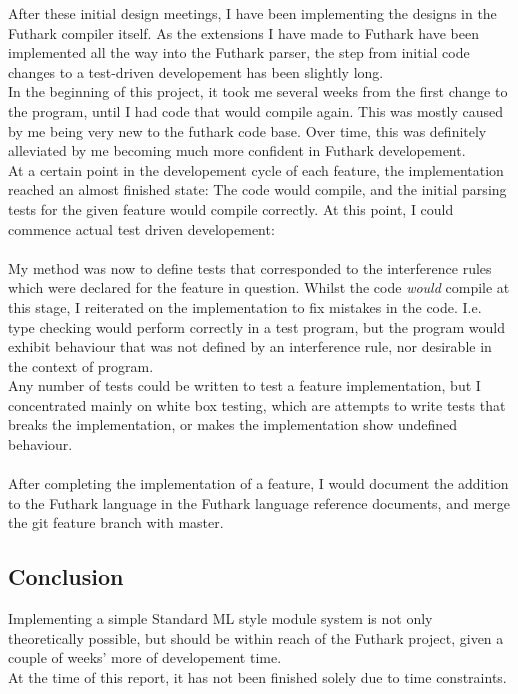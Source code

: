 After these initial design meetings, I have been implementing the designs in the
Futhark compiler itself. As the extensions I have made to Futhark have been
implemented all the way into the Futhark parser, the step from initial code
changes to a test-driven developement has been slightly long.
\\
In the beginning of this project, it took me several weeks from the first change to the program, until
I had code that would compile again. This was mostly caused by me being very
new to the futhark code base. Over time, this was definitely alleviated by me
becoming much more confident in Futhark developement.
\\
At a certain point in the developement cycle of each feature, the implementation
reached an almost finished state: The code would compile, and the initial
parsing tests for the given feature would compile correctly. At this point, I
could commence actual test driven developement:
\\
\\
My method was now to define tests that corresponded to the interference rules
which were declared for the feature in question. Whilst the code \textit{would}
compile at this stage, I reiterated on the implementation to fix mistakes in the
code.
I.e. type checking would perform correctly in a test program, but the program
would exhibit behaviour that was not defined by an interference rule, nor
desirable in the context of program.
\\
Any number of tests could be written to test a feature implementation, but I
concentrated mainly on white box testing, which are attempts to write tests that
breaks the implementation, or makes the implementation show undefined behaviour.
\\
\\
After completing the implementation of a feature, I would document the addition
to the Futhark language in the Futhark language reference documents, and merge
the git feature branch with master.

\subsection{Conclusion}
Implementing a simple Standard ML style module system is not only theoretically
possible, but should be within reach of the Futhark project, given a couple of
weeks' more of developement time.
\\
At the time of this report, it has not been finished solely due to time constraints.
\\
\\

